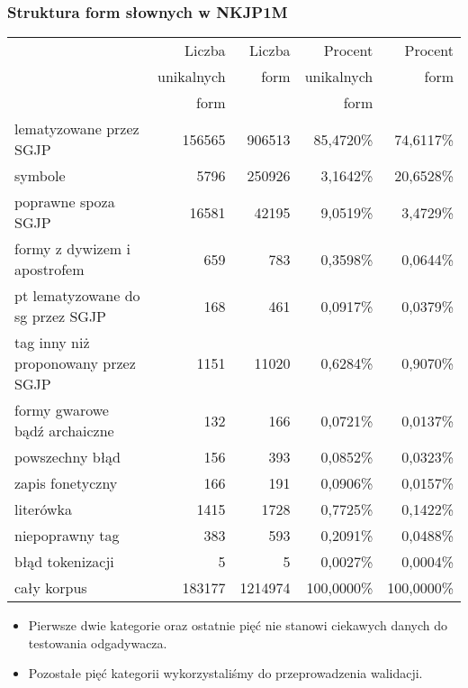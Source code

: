 \documentclass{beamer}
\begin{document}
\begin{frame}
\frametitle{Struktura form słownych w NKJP1M}
\begin{scriptsize}
\begin{tabular}{l|rrrr}
 & Liczba & Liczba & Procent & Procent\\
 & unikalnych & form & unikalnych & form\\
 & form & & form & \\
\hline
lematyzowane przez SGJP & 156565 & 906513 & 85,4720\% & 74,6117\%\\
symbole & 5796 & 250926 & 3,1642\% & 20,6528\%\\
\hline
poprawne spoza SGJP & 16581 & 42195 & 9,0519\% & 3,4729\%\\
formy z dywizem i apostrofem & 659 & 783 & 0,3598\% & 0,0644\%\\
pt lematyzowane do sg przez SGJP & 168 & 461 & 0,0917\% & 0,0379\%\\
tag inny niż proponowany przez SGJP & 1151 & 11020 & 0,6284\% & 0,9070\%\\
formy gwarowe bądź archaiczne & 132 & 166 & 0,0721\% & 0,0137\%\\
\hline
powszechny błąd & 156 & 393 & 0,0852\% & 0,0323\%\\
zapis fonetyczny & 166 & 191 & 0,0906\% & 0,0157\%\\
literówka & 1415 & 1728 & 0,7725\% & 0,1422\%\\
niepoprawny tag & 383 & 593 & 0,2091\% & 0,0488\%\\
błąd tokenizacji & 5 & 5 & 0,0027\% & 0,0004\%\\
\hline
cały korpus & 183177 & 1214974 & 100,0000\% & 100,0000\%\\
\end{tabular}
\end{scriptsize}
\begin{itemize}
\item Pierwsze dwie kategorie oraz ostatnie pięć nie stanowi ciekawych danych do testowania odgadywacza.
\item Pozostałe pięć kategorii wykorzystaliśmy do przeprowadzenia walidacji.
\end{itemize}
\end{frame}
\end{document}
